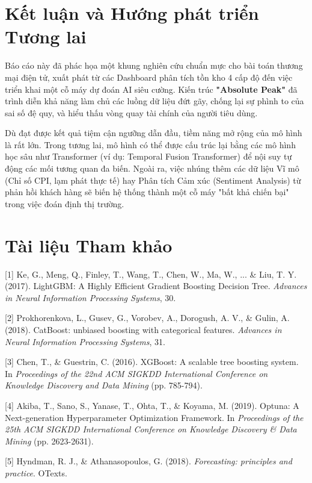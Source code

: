 \documentclass{article}
\begin{document}
\section{Kết luận và Hướng phát triển Tương lai}

Báo cáo này đã phác họa một khung nghiên cứu chuẩn mực cho bài toán thương mại điện tử, xuất phát từ các Dashboard phân tích tồn kho 4 cấp độ đến việc triển khai một cỗ máy dự đoán AI siêu cường. Kiến trúc \textbf{"Absolute Peak"} đã trình diễn khả năng làm chủ các luồng dữ liệu đứt gãy, chống lại sự phình to của sai số đệ quy, và hiểu thấu vòng quay tài chính của người tiêu dùng. 

Dù đạt được kết quả tiệm cận ngưỡng dẫn đầu, tiềm năng mở rộng của mô hình là rất lớn. Trong tương lai, mô hình có thể được cấu trúc lại bằng các mô hình học sâu như Transformer (ví dụ: Temporal Fusion Transformer) để nội suy tự động các mối tương quan đa biến. Ngoài ra, việc nhúng thêm các dữ liệu Vĩ mô (Chỉ số CPI, lạm phát thực tế) hay Phân tích Cảm xúc (Sentiment Analysis) từ phản hồi khách hàng sẽ biến hệ thống thành một cỗ máy "bất khả chiến bại" trong việc đoán định thị trường.

\section*{Tài liệu Tham khảo}

{\small
[1] Ke, G., Meng, Q., Finley, T., Wang, T., Chen, W., Ma, W., ... \& Liu, T. Y. (2017). LightGBM: A Highly Efficient Gradient Boosting Decision Tree. \textit{Advances in Neural Information Processing Systems}, 30.

[2] Prokhorenkova, L., Gusev, G., Vorobev, A., Dorogush, A. V., \& Gulin, A. (2018). CatBoost: unbiased boosting with categorical features. \textit{Advances in Neural Information Processing Systems}, 31.

[3] Chen, T., \& Guestrin, C. (2016). XGBoost: A scalable tree boosting system. In \textit{Proceedings of the 22nd ACM SIGKDD International Conference on Knowledge Discovery and Data Mining} (pp. 785-794).

[4] Akiba, T., Sano, S., Yanase, T., Ohta, T., \& Koyama, M. (2019). Optuna: A Next-generation Hyperparameter Optimization Framework. In \textit{Proceedings of the 25th ACM SIGKDD International Conference on Knowledge Discovery \& Data Mining} (pp. 2623-2631).

[5] Hyndman, R. J., \& Athanasopoulos, G. (2018). \textit{Forecasting: principles and practice}. OTexts.
}
\end{document}

